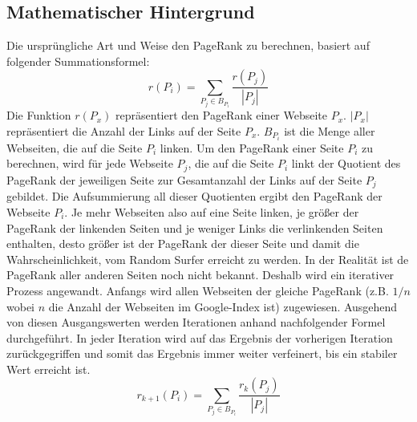 \documentclass[12pt, a4paper]{llncs}
\begin{document}
	\subsection{Mathematischer Hintergrund}
	Die ursprüngliche Art und Weise den PageRank zu berechnen, basiert auf folgender Summationsformel:
	\begin{displaymath}
		r(P_i)=\sum_{P_j\in B_{P_i}} \frac{r(P_j)}{|P_j|}
	\end{displaymath}
	Die Funktion $r(P_x)$ repräsentiert den PageRank einer Webseite $P_x$.\newline
	$|P_x|$ repräsentiert die Anzahl der Links auf der Seite $P_x$.\newline
	$B_{P_i}$ ist die Menge aller Webseiten, die auf die Seite $P_i$ linken.\newline
	Um den PageRank einer Seite $P_i$ zu berechnen, wird für jede Webseite $P_j$, die auf die Seite $P_i$ linkt der Quotient des PageRank der jeweiligen Seite zur
	Gesamtanzahl der Links auf der Seite $P_j$ gebildet. Die Aufsummierung all dieser Quotienten ergibt den PageRank der Webseite $P_i$. Je mehr Webseiten also auf
	eine Seite linken, je größer der PageRank der linkenden Seiten und je weniger Links die verlinkenden Seiten enthalten, desto größer ist der PageRank der dieser
	Seite und damit die Wahrscheinlichkeit, vom Random Surfer erreicht zu werden.\newline
	In der Realität ist de PageRank aller anderen Seiten noch nicht bekannt. Deshalb wird ein iterativer Prozess angewandt. Anfangs wird allen Webseiten der gleiche
	PageRank (z.B. $1/n$ wobei $n$ die Anzahl der Webseiten im Google-Index ist) zugewiesen. Ausgehend von diesen Ausgangswerten werden Iterationen anhand nachfolgender
	Formel durchgeführt. In jeder Iteration wird auf das Ergebnis der vorherigen Iteration zurückgegriffen und somit das Ergebnis immer weiter verfeinert, bis ein stabiler
	Wert erreicht ist.\cite{langville11}
	\begin{displaymath}
	r_{k+1}(P_i)=\sum_{P_j\in B_{P_i}} \frac{r_k(P_j)}{|P_j|}
	\end{displaymath}
	
	
\end{document}
